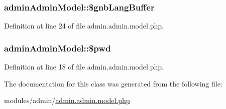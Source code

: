 \subsubsection[{\$gnb\+Lang\+Buffer}]{\setlength{\rightskip}{0pt plus 5cm}admin\+Admin\+Model\+::\$gnb\+Lang\+Buffer}\label{classadminAdminModel_acd5e0dd59b6eb5c0df5638247797c799}


Definition at line 24 of file admin.\+admin.\+model.\+php.

\hypertarget{classadminAdminModel_a0c3f3a9ef22f7f5b6ed159a11d8d8e45}{}
\subsubsection[{\$pwd}]{\setlength{\rightskip}{0pt plus 5cm}admin\+Admin\+Model\+::\$pwd}\label{classadminAdminModel_a0c3f3a9ef22f7f5b6ed159a11d8d8e45}


Definition at line 18 of file admin.\+admin.\+model.\+php.



The documentation for this class was generated from the following file\+:\begin{DoxyCompactItemize}
\item 
modules/admin/\hyperlink{admin_8admin_8model_8php}{admin.\+admin.\+model.\+php}\end{DoxyCompactItemize}
